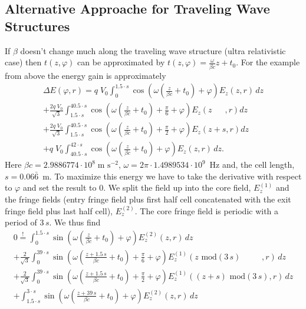 \documentclass[automark,a4paper,11pt,headsepline]{scrartcl}
\begin{document}
\subsection{Alternative Approache for Traveling Wave Structures}
If $\beta$ doesn't change much along the traveling wave structure (ultra relativistic case) then $t(z,\varphi)$ can be approximated by $t(z,\varphi)=\frac{\omega}{\beta c}z + t_{0}$. For the example from above the energy gain is approximately
\begin{multline*}
\Delta E(\varphi,r) = q\;V_0 \int_{0}^{1.5\cdot s} \cos\left(\omega \left(\frac{z}{\beta c} + t_{0}\right) + \varphi\right) E_z(z,r)\, dz\\
+ \frac{2 q\;V_{0}}{\sqrt{3}} \int_{1.5\cdot s}^{40.5\cdot s}\cos\left(\omega \left(\frac{z}{\beta c} + t_{0}\right) + \frac{\pi}{6} + \varphi \right) E_z(z\;\;\quad,r) dz\\
+ \frac{2 q\;V_{0}}{\sqrt{3}} \int_{1.5\cdot s}^{40.5\cdot s}\cos\left(\omega \left(\frac{z}{\beta c} + t_{0}\right) + \frac{\pi}{2} + \varphi \right) E_z(z+s,r) dz \\
  + q\;V_{0} \int_{40.5\cdot s}^{42\cdot s} \cos\left(\omega \left(\frac{z}{\beta c} + t_{0}\right) + \varphi\right) E_z(z,r)\, dz.
\end{multline*}
Here $\beta c = 2.9886774\cdot10^8\;\text{m s}^{-2}$, $\omega = 2\pi\cdot 1.4989534\cdot10^9$~Hz and, the cell length, $s = 0.06\bar{6}$~m. To maximize this energy we have to take the derivative with respect to $\varphi$ and set the result to $0$. We split the field up into the core field, $E_z^{(1)}$ and the fringe fields (entry fringe field plus first half cell concatenated with the exit fringe field plus last half cell), $E_z^{(2)}$. The core fringe field is periodic with a period of $3\,s$. We thus find
\begin{multline*}
0 \stackrel{!}{=} \int_{0}^{1.5\cdot s} \sin\left(\omega \left(\frac{z}{\beta c} + t_{0}\right) + \varphi\right) E_z^{(2)}(z,r)\, dz \\
                + \frac{2}{\sqrt{3}} \int_{0}^{39\cdot s}\sin\left(\omega \left(\frac{z + 1.5\,s}{\beta c} + t_{0}\right) + \frac{\pi}{6} + \varphi \right) E_z^{(1)}(z \text{ mod}(3\,s)\;\;\qquad,r)\,dz \\
                + \frac{2}{\sqrt{3}} \int_{0}^{39\cdot s}\sin\left(\omega \left(\frac{z + 1.5\,s}{\beta c} + t_{0}\right) + \frac{\pi}{2} + \varphi \right) E_z^{(1)}((z + s) \text{ mod} (3\,s),r)\, dz \\
                + \int_{1.5\cdot s}^{3\cdot s} \sin\left(\omega\left(\frac{z + 39\,s}{\beta c} + t_{0}\right) + \varphi\right) E_z^{(2)}(z,r)\, dz
\end{multline*}
\end{document}
